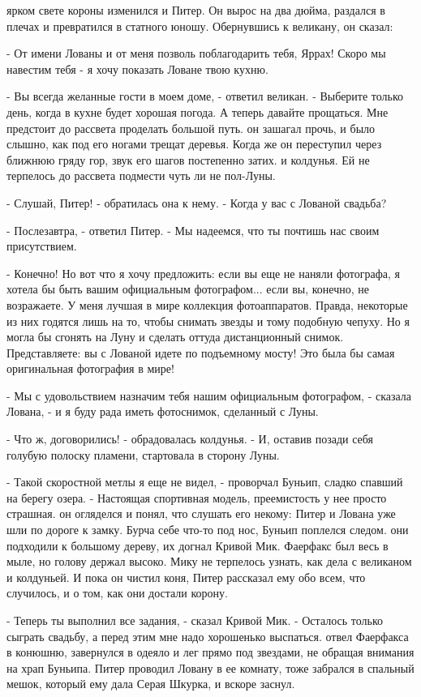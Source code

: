  ярком свете короны изменился и Питер. Он вырос на два дюйма, 
раздался в плечах и превратился в статного юношу. Обернувшись к 
великану, он сказал:
\par- От имени Лованы и от меня позволь поблагодарить тебя, Яррах! 
Скоро мы навестим тебя - я хочу показать Ловане твою кухню.
\par- Вы всегда желанные гости в моем доме, - ответил великан. - 
Выберите только день, когда в кухне будет хорошая погода. А теперь 
давайте прощаться. Мне предстоит до рассвета проделать большой путь.
 он зашагал прочь, и было слышно, как под его ногами трещат 
деревья. Когда же он переступил через ближнюю гряду гор, звук его 
шагов постепенно затих.
 и колдунья. Ей не терпелось до рассвета подмести чуть 
ли не пол-Луны.
\par- Слушай, Питер! - обратилась она к нему. - Когда у вас с Лованой 
свадьба?
\par- Послезавтра, - ответил Питер. - Мы надеемся, что ты почтишь нас 
своим присутствием.
\par- Конечно! Но вот что я хочу предложить: если вы еще не наняли 
фотографа, я хотела бы быть вашим официальным фотографом... если вы, 
конечно, не возражаете. У меня лучшая в мире коллекция фотоаппаратов. 
Правда, некоторые из них годятся лишь на то, чтобы снимать звезды и 
тому подобную чепуху. Но я могла бы сгонять на Луну и сделать оттуда 
дистанционный снимок. Представляете: вы с Лованой идете по подъемному 
мосту! Это была бы самая оригинальная фотография в мире!
\par- Мы с удовольствием назначим тебя нашим официальным фотографом, - 
сказала Лована, - и я буду рада иметь фотоснимок, сделанный с Луны.
\par- Что ж, договорились! - обрадовалась колдунья. - И, оставив 
позади себя голубую полоску пламени, стартовала в сторону Луны.
\par- Такой скоростной метлы я еще не видел, - проворчал Буньип, 
сладко спавший на берегу озера. - Настоящая спортивная модель, 
преемистость у нее просто страшная.
 он огляделся и понял, что слушать его некому: Питер и Лована 
уже шли по дороге к замку. Бурча себе что-то под нос, Буньип поплелся 
следом.
 они подходили к большому дереву, их догнал Кривой Мик. 
Фаерфакс был весь в мыле, но голову держал высоко.
 Мику не терпелось узнать, как дела с великаном и 
колдуньей. И пока он чистил коня, Питер рассказал ему обо всем, что 
случилось, и о том, как они достали корону.
\par- Теперь ты выполнил все задания, - сказал Кривой Мик. - Осталось 
только сыграть свадьбу, а перед этим мне надо хорошенько выспаться.
 отвел Фаерфакса в конюшню, завернулся в одеяло и лег прямо под 
звездами, не обращая внимания на храп Буньипа. Питер проводил Ловану в 
ее комнату, тоже забрался в спальный мешок, который ему дала Серая 
Шкурка, и вскоре заснул.
